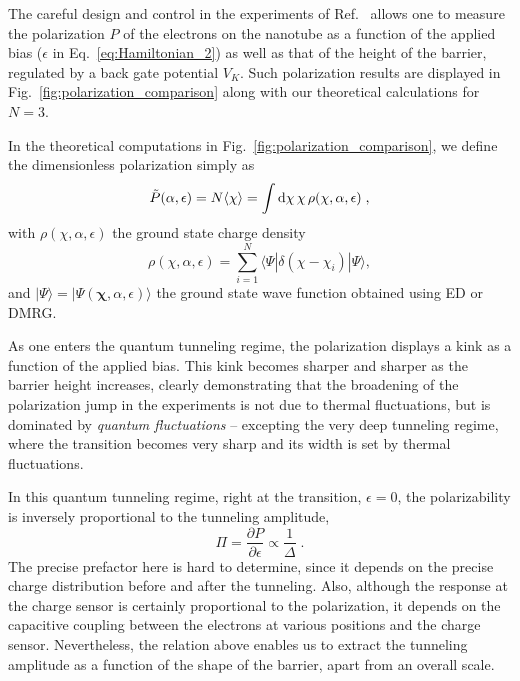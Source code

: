 \documentclass[aps, prb, floatfix, twocolumn, notitlepage, superscriptaddress, 10pt]{revtex4-2}
\newcommand{\n}{N}
\newcommand{\be}{\begin{equation}}
\newcommand{\ee}{\end{equation}}
\newcommand{\bra}[1]{\langle #1|}
\newcommand{\ket}[1]{|#1\rangle}
\newcommand{\bchi}{\boldsymbol \chi}
\newcommand{\1}{{1\hspace*{-0.5ex} \textrm{l} \hspace*{0.5ex}}}
\begin{document}
The careful design and control in the experiments of Ref.~\cite{Shapir.2019} allows one to 
measure the polarization ${P}$ of the electrons on the nanotube as a function of the  applied bias 
($\epsilon$  in Eq.~\eqref{eq:Hamiltonian_2})  as well as  that of the height of the barrier, regulated by a back gate potential $V_K$. 
Such polarization results are displayed in Fig.~\ref{fig:polarization_comparison} along with our theoretical calculations for $N=3$.

In the theoretical computations in Fig.~\ref{fig:polarization_comparison}, we define the dimensionless polarization simply as
\begin{equation}
\tilde{P} (\alpha, \epsilon) = N \langle \chi\rangle = \int\limits {\rm d} \chi  \,\chi \,\rho (\chi, \alpha,\epsilon)   \;,
\label{eq:pol}
\end{equation}
with $ \rho (\chi, \alpha,\epsilon) $ the ground state charge density
\begin{equation}
\rho(\chi,\alpha, \epsilon) = \sum_{i=1}^\n \bra{\Psi}  \delta(\chi - \chi_i)\ket{\Psi},
\end{equation}
and  $\ket{\Psi} = \ket{\Psi(\bchi, \alpha, \epsilon)}$ the ground state wave function 
obtained using ED or DMRG. 





As one enters the quantum tunneling regime, the polarization displays a 
kink as a function of the  applied bias. This kink becomes sharper and sharper 
as  the barrier height increases,  clearly demonstrating that 
the broadening of the polarization jump in the experiments is not due to thermal fluctuations, but is 
dominated by \emph{quantum fluctuations} – excepting the very deep tunneling regime, where 
the transition becomes very sharp and its width is set by thermal fluctuations. 

In this quantum tunneling regime,  right at the transition, $\epsilon=0$, 
the polarizability  is inversely proportional to the tunneling amplitude, 
\be
\Pi = \frac{\partial {P}}{\partial \epsilon} \propto \frac 1 {\Delta}\;.
\ee
The precise prefactor here is  hard to determine, since it depends on the precise charge distribution 
before and after the tunneling. Also, although the response at the charge sensor is certainly 
proportional to the polarization, it depends on the capacitive coupling between 
the electrons at various positions and the charge sensor.
Nevertheless, the relation above  enables us to extract the tunneling amplitude as a function 
 of the shape of the barrier, apart from an overall scale. 
\end{document}
